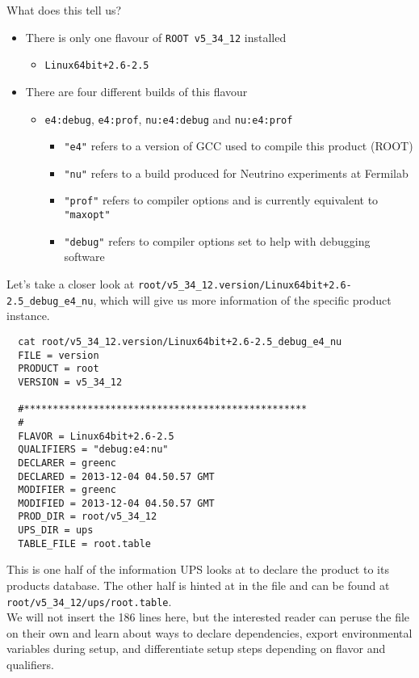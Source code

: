 \documentclass[letterpaper,10pt]{article}
\begin{document}
\noindent
What does this tell us?
\begin{itemize}
\item There is only one flavour of \verb|ROOT v5_34_12| installed 
  \begin{itemize}
  \item \verb|Linux64bit+2.6-2.5|
  \end{itemize}
\item There are four different builds of this flavour
\begin{itemize}
  \item \verb|e4:debug|, \verb|e4:prof|, \verb|nu:e4:debug| and \verb|nu:e4:prof|
  \begin{itemize}
    \item \verb|"e4"| refers to a version of GCC used to compile this product (ROOT)
    \item \verb|"nu"| refers to a build produced for Neutrino experiments at Fermilab
    \item \verb|"prof"| refers to compiler options and is currently equivalent to \verb|"maxopt"|
    \item \verb|"debug"| refers to compiler options set to help with debugging software
    \end{itemize}
  \end{itemize}
\end{itemize}

\noindent
Let's take a closer look at \verb|root/v5_34_12.version/Linux64bit+2.6-2.5_debug_e4_nu|, which will give us more information of the specific product instance.
\begin{verbatim}
  cat root/v5_34_12.version/Linux64bit+2.6-2.5_debug_e4_nu
  FILE = version
  PRODUCT = root
  VERSION = v5_34_12

  #*************************************************
  #
  FLAVOR = Linux64bit+2.6-2.5
  QUALIFIERS = "debug:e4:nu"
  DECLARER = greenc
  DECLARED = 2013-12-04 04.50.57 GMT
  MODIFIER = greenc
  MODIFIED = 2013-12-04 04.50.57 GMT
  PROD_DIR = root/v5_34_12
  UPS_DIR = ups
  TABLE_FILE = root.table
\end{verbatim}
This is one half of the information UPS looks at to declare the product to its products database. The other half is hinted at in the file and can be found at \verb|root/v5_34_12/ups/root.table|.\\

\noindent
We will not insert the 186 lines here, but the interested reader can peruse the file on their own and learn about ways to declare dependencies, export environmental variables during setup, and differentiate setup steps depending on flavor and qualifiers. \\
\end{document}
